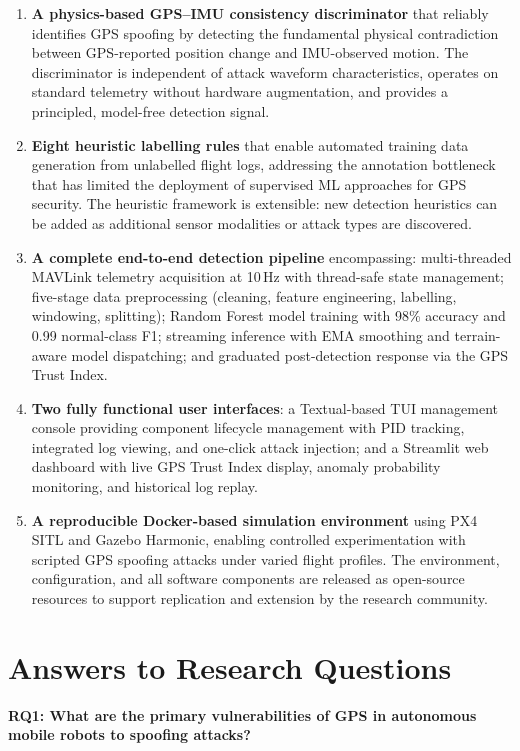 \begin{enumerate}
    \item \textbf{A physics-based GPS--IMU consistency discriminator} that reliably identifies GPS spoofing by detecting the fundamental physical contradiction between GPS-reported position change and IMU-observed motion. The discriminator is independent of attack waveform characteristics, operates on standard telemetry without hardware augmentation, and provides a principled, model-free detection signal.
    \item \textbf{Eight heuristic labelling rules} that enable automated training data generation from unlabelled flight logs, addressing the annotation bottleneck that has limited the deployment of supervised ML approaches for GPS security. The heuristic framework is extensible: new detection heuristics can be added as additional sensor modalities or attack types are discovered.
    \item \textbf{A complete end-to-end detection pipeline} encompassing: multi-threaded MAVLink telemetry acquisition at 10\,Hz with thread-safe state management; five-stage data preprocessing (cleaning, feature engineering, labelling, windowing, splitting); Random Forest model training with 98\% accuracy and 0.99 normal-class F1; streaming inference with EMA smoothing and terrain-aware model dispatching; and graduated post-detection response via the GPS Trust Index.
    \item \textbf{Two fully functional user interfaces}: a Textual-based TUI management console providing component lifecycle management with PID tracking, integrated log viewing, and one-click attack injection; and a Streamlit web dashboard with live GPS Trust Index display, anomaly probability monitoring, and historical log replay.
    \item \textbf{A reproducible Docker-based simulation environment} using PX4 SITL and Gazebo Harmonic, enabling controlled experimentation with scripted GPS spoofing attacks under varied flight profiles. The environment, configuration, and all software components are released as open-source resources to support replication and extension by the research community.
\end{enumerate}

\section{Answers to Research Questions}

\textbf{RQ1: What are the primary vulnerabilities of GPS in autonomous mobile robots to spoofing attacks?}

